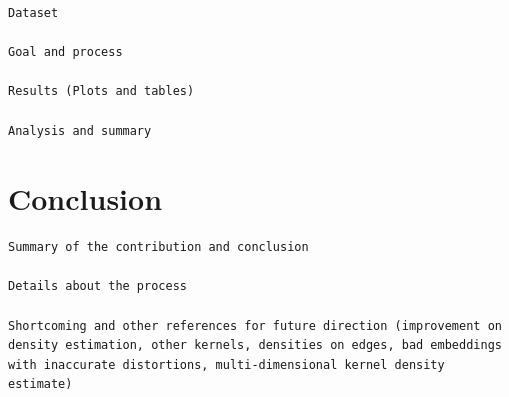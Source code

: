 \documentclass[11pt,a4paper,]{article}
\begin{document}
\begin{verbatim}
Dataset

Goal and process

Results (Plots and tables)

Analysis and summary
\end{verbatim}

\hypertarget{conclusion}{%
\section{Conclusion}\label{conclusion}}

\begin{verbatim}
Summary of the contribution and conclusion

Details about the process

Shortcoming and other references for future direction (improvement on density estimation, other kernels, densities on edges, bad embeddings with inaccurate distortions, multi-dimensional kernel density estimate)
\end{verbatim}

\printbibliography
\end{document}
